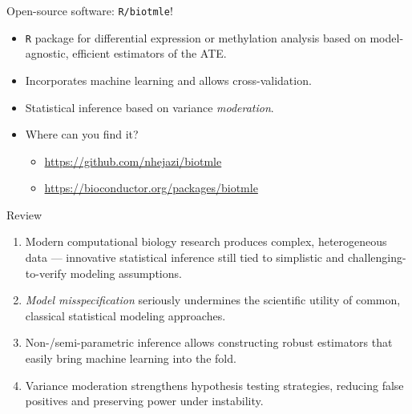 \documentclass{beamer}
\begin{document}

\begin{frame}[c]{Open-source software: \texttt{R/biotmle}!}

\begin{center}
\begin{itemize}
  \itemsep6pt
  \item \texttt{R} package for differential expression or methylation analysis
     based on model-agnostic, efficient estimators of the ATE.
  \item Incorporates machine learning and allows cross-validation.
  \item Statistical inference based on variance \textit{moderation}.
  \item Where can you find it?
    \begin{itemize}
      \itemsep4pt
      \item \url{https://github.com/nhejazi/biotmle}
      \item \url{https://bioconductor.org/packages/biotmle}
    \end{itemize}
\end{itemize}
\end{center}

\end{frame}


\begin{frame}[c]{Review}
\begin{center}
\begin{enumerate}
  \itemsep6pt
  \item Modern computational biology research produces complex, heterogeneous
    data --- innovative statistical inference still tied to simplistic and
    challenging-to-verify modeling assumptions.
  \item \textit{Model misspecification} seriously undermines the scientific
    utility of common, classical statistical modeling approaches.
  \item Non-/semi-parametric inference allows constructing robust estimators
    that easily bring machine learning into the fold.
  \item Variance moderation strengthens hypothesis testing strategies, reducing
    false positives and preserving power under instability.
\end{enumerate}
\end{center}


\end{frame}
\end{document}
